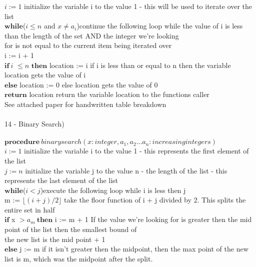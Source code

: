 \documentclass{article}
\begin{document}
\begin{flushleft}
$\textit{i} := 1$ {\tiny initialize the variable i to the value 1 - this will be used to iterate over the list}\\
$\textbf{while}$($i \leq n$ and $x\neq a_i$){\tiny continue the following loop while the value of i is less than the length of the set AND the integer we're looking\\ for is not equal to the current item being iterated over} \\
\setlength\parindent{48pt} i := i + 1\\
\setlength\parindent{24pt} $\textbf{if}\: i $ $\leq n$ $\textbf{then}$ location := i  {\tiny if i is less than or equal to n then the variable location gets the value of i}\\
\setlength\parindent{24pt} $\textbf{else}$ location := 0 {\tiny else location gets the value of 0}\\
\setlength\parindent{24pt}$\textbf{return}$ location {\tiny return the variable location to the functions caller} \\
{\tiny *See attached paper for handwritten table breakdown} \\
~\\
14 - Binary Search) \\
~\\
\setlength\parindent{24pt}$\textbf{procedure} \: binary search(x: integer, a_1, a_2 . . . a_n: increasing integers)$ \\
$\textit{i} := 1$ {\tiny initialize the variable i to the value 1 - this represents the first element of the list}\\
$\textit{j} := n$ {\tiny initialize the variable j to the value n - the length of the list - this represents the last element of the list}\\
$\textbf{while}$($i < j$){\tiny execute the following loop while i is less then j} \\
\setlength\parindent{48pt} m := $\lfloor (i + j) /2 \rfloor$ {\tiny take the floor function of i + j divided by 2.  This splits the entire set in half}\\
\setlength\parindent{48pt} $\textbf{if}$ x $> a_m \: \textbf{then}$ i := m + 1 {\tiny If the value we're looking for is greater then the mid point of the list then the smallest bound of \\the new list is the mid point + 1}\\  
\setlength\parindent{48pt} $\textbf{else}$ j := m {\tiny if it isn't greater then the midpoint, then the max point of the new list is m, which was the midpoint after the split.}\\

\end{flushleft}
\end{document}
